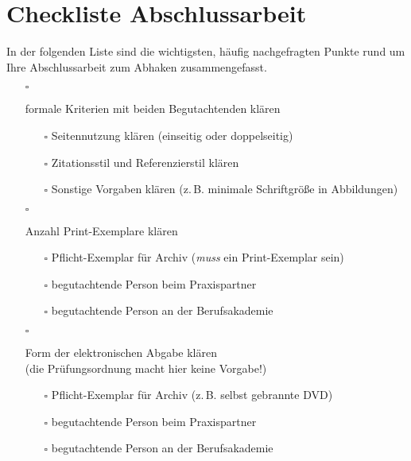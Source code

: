 \pagestyle{empty}
\cleardoublepage
{}
\renewcommand{\thefootnote}{\alph{footnote}}
\setcounter{footnote}{0}
\chapter*{Checkliste Abschlussarbeit}
In der folgenden Liste sind die wichtigsten, häufig nachgefragten Punkte rund um Ihre Abschlussarbeit zum Abhaken zusammengefasst.

\begin{itemize}
    \item[$\square$]{
        formale Kriterien mit beiden Begutachtenden klären
        \begin{itemize}
            \item[$\square$] Seitennutzung klären (einseitig oder doppelseitig)
            \item[$\square$] Zitationsstil und Referenzierstil klären
            \item[$\square$]{
                Sonstige Vorgaben klären (z.\,B. minimale Schriftgröße in Abbildungen)
            }
        \end{itemize}
    }
    \item[$\square$]{
        Anzahl Print-Exemplare klären
        \begin{itemize}
            \item[$\square$] Pflicht-Exemplar für Archiv (\emph{muss} ein Print-Exemplar sein)
            \item[$\square$] begutachtende Person beim Praxispartner
            \item[$\square$] begutachtende Person an der Berufsakademie
        \end{itemize}
    }
    \item[$\square$]{
        Form der elektronischen Abgabe klären\\
        (die Prüfungsordnung macht hier keine Vorgabe!)
        \begin{itemize}
            \item[$\square$] Pflicht-Exemplar für Archiv (z.\,B. selbst gebrannte DVD)
            \item[$\square$] begutachtende Person beim Praxispartner
            \item[$\square$] begutachtende Person an der Berufsakademie
        \end{itemize}
}
\end{itemize}

